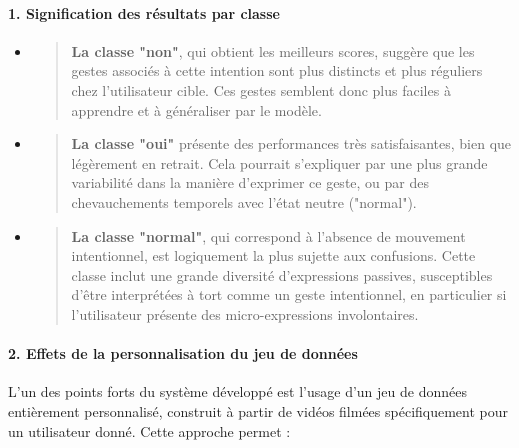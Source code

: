 \documentclass[
]{article}
\begin{document}
\hypertarget{signification-des-ruxe9sultats-par-classe}{%
\paragraph{\texorpdfstring{\textbf{1. Signification des résultats par classe}}{1. Signification des résultats par classe}}\label{signification-des-ruxe9sultats-par-classe}}

\begin{itemize}
\item
  \begin{quote}
  \textbf{La classe "non"}, qui obtient les meilleurs scores, suggère que les gestes associés à cette intention sont plus distincts et plus réguliers chez l'utilisateur cible. Ces gestes semblent donc plus faciles à apprendre et à généraliser par le modèle.
  \end{quote}
\item
  \begin{quote}
  \textbf{La classe "oui"} présente des performances très satisfaisantes, bien que légèrement en retrait. Cela pourrait s'expliquer par une plus grande variabilité dans la manière d'exprimer ce geste, ou par des chevauchements temporels avec l'état neutre ("normal").
  \end{quote}
\item
  \begin{quote}
  \textbf{La classe "normal"}, qui correspond à l'absence de mouvement intentionnel, est logiquement la plus sujette aux confusions. Cette classe inclut une grande diversité d'expressions passives, susceptibles d'être interprétées à tort comme un geste intentionnel, en particulier si l'utilisateur présente des micro-expressions involontaires.
  \end{quote}
\end{itemize}

\hypertarget{effets-de-la-personnalisation-du-jeu-de-donnuxe9es}{%
\paragraph{\texorpdfstring{\textbf{2. Effets de la personnalisation du jeu de données}}{2. Effets de la personnalisation du jeu de données}}\label{effets-de-la-personnalisation-du-jeu-de-donnuxe9es}}

L'un des points forts du système développé est l'usage d'un jeu de données entièrement personnalisé, construit à partir de vidéos filmées spécifiquement pour un utilisateur donné. Cette approche permet :
\end{document}
